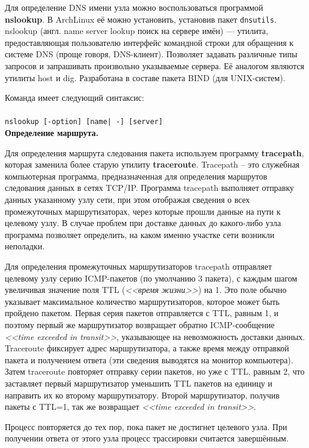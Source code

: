 \documentclass[a4paper]{article}
\begin{document}
Для определение DNS имени узла можно воспользоваться программой \textbf{nslookup}. В ArchLinux её можно установить, установив пакет \texttt{dnsutils}. nslookup (англ. name server lookup поиск на сервере имён) — утилита, предоставляющая пользователю интерфейс командной строки для обращения к системе DNS (проще говоря, DNS-клиент). Позволяет задавать различные типы запросов и запрашивать произвольно указываемые сервера. Её аналогом являются утилиты host и dig. Разработана в составе пакета BIND (для UNIX-систем).

			Команда имеет следующий синтаксис:\\\\
			\texttt{nslookup [-option] [name| -] [server]}\\

			\textbf{Определение маршрута.}
			
			Для определения маршрута следования пакета используем программу \textbf{tracepath}, которая заменила более старую утилиту \textbf{traceroute}. Tracepath -- это служебная компьютерная программа, предназначенная для определения маршрутов следования данных в сетях TCP/IP. Программа tracepath выполняет отправку данных указанному узлу сети, при этом отображая сведения о всех промежуточных маршрутизаторах, через которые прошли данные на пути к целевому узлу. В случае проблем при доставке данных до какого-либо узла программа позволяет определить, на каком именно участке сети возникли неполадки.
			
			Для определения промежуточных маршрутизаторов tracepath отправляет целевому узлу серию ICMP-пакетов (по умолчанию 3 пакета), с каждым шагом увеличивая значение поля TTL (\emph{<<время жизни>>}) на 1. Это поле обычно указывает максимальное количество маршрутизаторов, которое может быть пройдено пакетом. Первая серия пакетов отправляется с TTL, равным 1, и поэтому первый же маршрутизатор возвращает обратно ICMP-сообщение \emph{<<time exceeded in transit>>}, указывающее на невозможность доставки данных. Traceroute фиксирует адрес маршрутизатора, а также время между отправкой пакета и получением ответа (эти сведения выводятся на монитор компьютера). Затем traceroute повторяет отправку серии пакетов, но уже с TTL, равным 2, что заставляет первый маршрутизатор уменьшить TTL пакетов на единицу и направить их ко второму маршрутизатору. Второй маршрутизатор, получив пакеты с TTL=1, так же возвращает \emph{<<time exceeded in transit>>}.
			
			Процесс повторяется до тех пор, пока пакет не достигнет целевого узла. При получении ответа от этого узла процесс трассировки считается завершённым.
			
\end{document}
